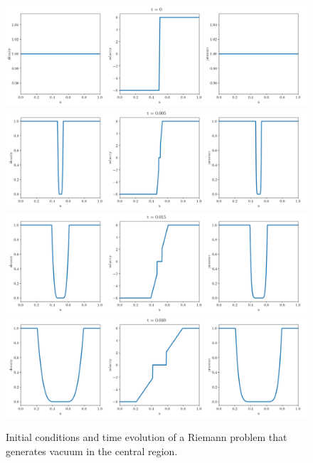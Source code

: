 \begin{figure}
\centering
\includegraphics[width=\textwidth]{
./figures/FV/vacuum_generating_ICs/vacuum_generating.png} %
\includegraphics[width=\textwidth]{
./figures/FV/vacuum_generating_ICs/riemann-approximate-vacuum_generating-0.005.png} %
\includegraphics[width=\textwidth]{
./figures/FV/vacuum_generating_ICs/riemann-approximate-vacuum_generating-0.015.png} %
\includegraphics[width=\textwidth]{
./figures/FV/vacuum_generating_ICs/riemann-approximate-vacuum_generating-0.040.png} %
\caption[Riemann problem that generates a central vacuum]{
    Initial conditions and time evolution of a Riemann problem that generates vacuum in the central
    region.
    }%
    \label{fig:vacuum-generating}
\end{figure}













